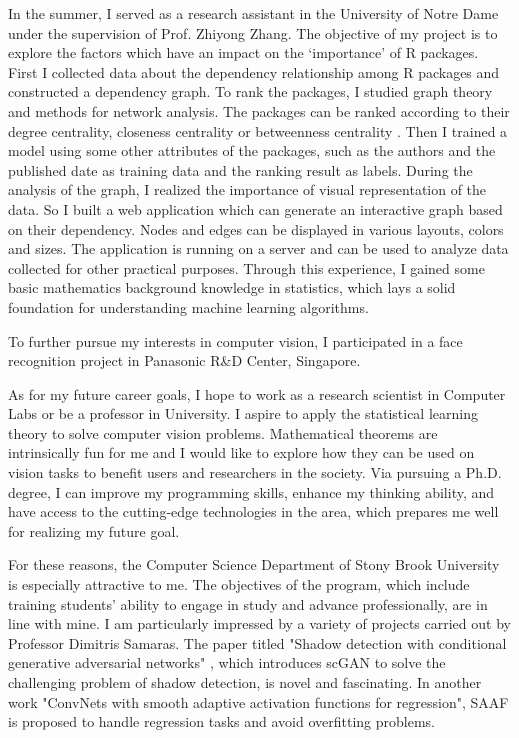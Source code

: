 \documentclass{article}
\begin{document}
\begin{Large}
\par{In the summer, I served as a research assistant in the University of Notre Dame under the supervision of Prof. Zhiyong Zhang. The objective of my project is to explore the factors which have an impact on the ‘importance’ of R packages. First I collected data about the dependency relationship among R packages and constructed a dependency graph. To rank the packages, I studied graph theory and methods for network analysis. The packages can be ranked according to their degree centrality, closeness centrality or betweenness centrality . Then I trained a model using some other attributes of the packages, such as the authors and the published date as training data and the ranking result as labels. During the analysis of the graph, I realized the importance of visual representation of the data. So I built a web application which can generate an interactive graph based on their dependency. Nodes and edges can be displayed in various layouts, colors and sizes. The application is running on a server and can be used to analyze data collected for other practical purposes. Through this experience, I gained some basic mathematics background knowledge in statistics, which lays a solid foundation for understanding machine learning algorithms.}
\par{To further pursue my interests in computer vision, I participated in a face recognition project in Panasonic R\&D Center, Singapore.  
}
\par{As for my future career goals, I hope to work as a research scientist in Computer Labs or be a professor in University. I aspire to apply the statistical learning theory to solve computer vision problems. Mathematical theorems are intrinsically fun for me and I would like to explore how they can be used on vision tasks to benefit users and researchers in the society. Via pursuing a Ph.D. degree, I can improve my programming skills, enhance my thinking ability, and have access to the cutting-edge technologies in the area, which prepares me well for realizing my future goal. 
}
\par{For these reasons, the Computer Science Department of Stony Brook University is especially attractive to me. The objectives of the program, which include training students’ ability to engage in study and advance professionally, are in line with mine. I am particularly impressed by a variety of projects carried out by Professor Dimitris Samaras.  The paper titled "Shadow detection with conditional generative adversarial networks" , which introduces scGAN to solve the challenging problem of shadow detection, is novel and fascinating. In another work "ConvNets with smooth adaptive activation functions for regression", SAAF is proposed to handle regression tasks and avoid overfitting problems.}

\end{Large}
\end{document}
